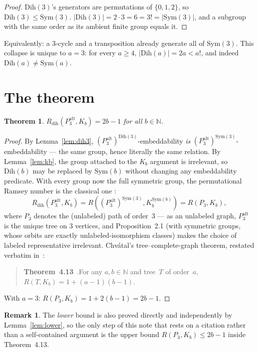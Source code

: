 \documentclass[11pt]{article}
\newtheorem{theorem}{Theorem}
\theoremstyle{definition}
\newtheorem*{remark}{Remark}
\newcommand{\Dih}{\mathrm{Dih}}
\newcommand{\Sym}{\mathrm{Sym}}
\newcommand{\Rdih}{R_{\mathrm{dih}}}
\newcommand{\Palt}{P_3^{\mathrm{alt}}}
\begin{document}
\begin{proof}
$\Dih(3)$'s generators are permutations of $\{0, 1, 2\}$, so
$\Dih(3) \le \Sym(3)$. $|\Dih(3)| = 2 \cdot 3 = 6 = 3! = |\Sym(3)|$, and a
subgroup with the same order as its ambient finite group equals it.
\end{proof}

Equivalently: a 3-cycle and a transposition already generate all of $\Sym(3)$.
This collapse is unique to $a=3$: for every $a \ge 4$,
$|\Dih(a)| = 2a < a!$, and indeed $\Dih(a) \ne \Sym(a)$.

\section{The theorem}

\begin{theorem}\label{thm:main}
$\Rdih(\Palt, K_b) = 2b-1$ for all $b \in \mathbb{N}$.
\end{theorem}

\begin{proof}
By Lemma~\ref{lem:dih3}, $(\Palt)^{\Dih(3)}$-embeddability \emph{is}
$(\Palt)^{\Sym(3)}$-embeddability --- the same group, hence literally the same
relation. By Lemma~\ref{lem:kb}, the group attached to the $K_b$ argument is
irrelevant, so $\Dih(b)$ may be replaced by $\Sym(b)$ without changing any
embeddability predicate. With every group now the full symmetric group, the
permutational Ramsey number is the classical one \cite[\S1]{DD26}:
\[
  \Rdih(\Palt, K_b) = R((\Palt)^{\Sym(3)}, K_b^{\Sym(b)}) = R(P_3, K_b),
\]
where $P_3$ denotes the (unlabeled) path of order~3 --- as an unlabeled graph,
$\Palt$ is the unique tree on 3 vertices, and Proposition~2.1 (with symmetric
groups, whose orbits are exactly unlabeled-isomorphism classes) makes the choice
of labeled representative irrelevant. Chv\'atal's tree--complete-graph theorem,
restated verbatim in~\cite{DD26}:

\begin{quote}
\textbf{Theorem~4.13}~\cite[quoting \cite{Chv77}]{DD26}.\quad For any
$a, b \in \mathbb{N}$ and tree~$T$ of order~$a$,
$R(T, K_b) = 1 + (a-1)(b-1)$.
\end{quote}

With $a=3$: $R(P_3, K_b) = 1 + 2(b-1) = 2b-1$.
\end{proof}

\begin{remark}
The \emph{lower} bound is also proved directly and independently by
Lemma~\ref{lem:lower}, so the only step of this note that rests on a citation
rather than a self-contained argument is the upper bound
$R(P_3, K_b) \le 2b-1$ inside Theorem~4.13.
\end{remark}
\end{document}
